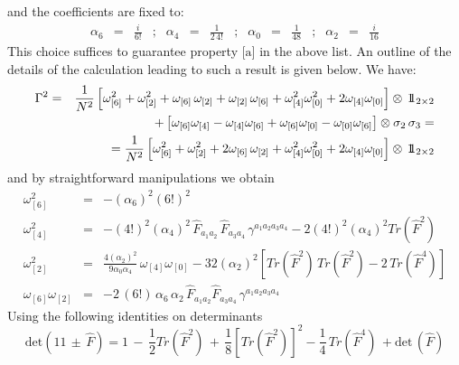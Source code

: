 \documentclass[a4paper,11pt]{article}
\begin{document}
and the coefficients are fixed to:
\begin{equation}
\begin{array}{rclcrclcrclcrcl}
\alpha_6 & = & \frac{i}{6!} &;&
\alpha_4 & = & \frac{1}{2 \, 4!} &;&
\alpha_0 & = & \frac{1}{48} &;&
\alpha_2 & = & \frac{i}{16}
\end{array}
\label{def alfa}
\end{equation}
This choice suffices to guarantee property $\mbox{[a]}$ in the above
list. An outline of the details of the calculation leading to such a result is given below. We have:
\begin{eqnarray}
\Gamma^{2} & = & \frac{1}{N^{2}} \left[\omega_{[6]}^{2} + \omega_{[2]}^{2} +
 \omega_{[6]} \, \omega_{[2]} + \omega_{[2]} \, \omega_{[6]} + \omega_{[4]}^{2} \omega_{[0]}^{2} +
2 \omega_{[4]} \omega_{[0]} \right] \otimes \, 1\!\!1_{2 \times 2} \nonumber \\
&& \hspace{0.3cm} + \left[\omega_{[6]}\omega_{[4]} - \omega_{[4]}\omega_{[6]} + \omega_{[6]} \omega_{[0]} - \omega_{[0]} \omega_{[6]} \right] \otimes \sigma_2 \, \sigma_3 = \nonumber \\
&& \hspace{-0.6cm} = \frac{1}{N^{2}} \left[\omega_{[6]}^{2} + \omega_{[2]}^{2} +
2 \omega_{[6]} \, \omega_{[2]} + \omega_{[4]}^{2} \omega_{[0]}^{2} +
2 \omega_{[4]} \omega_{[0]} \right] \otimes \, 1\!\!1_{2 \times 2}
\label{calc gamma}
\end{eqnarray}
and by straightforward manipulations we obtain
\begin{eqnarray}
\omega_{[6]}^{2} & = & - (\alpha_6)^{2}(6!)^{2} \nonumber \\
\omega_{[4]}^{2} & = & - (4!)^{2} (\alpha_{4})^{2} \,\hat{F}_{a_1 a_2} \,
\hat{F}_{a_3 a_4} \, \gamma^{a_1 a_2 a_3 a_4} - 2 (4!)^{2} (\alpha_{4})^{2} Tr(\hat{F}^{2}) \nonumber \\
\omega_{[2]}^{2} & = & \frac{4 (\alpha_2)^{2}}{9 \alpha_0 \alpha_4} \,
\omega_{[4]} \omega_{[0]} - 32 (\alpha_2)^{2} \left[Tr(\hat{F}^{2}) \, Tr(\hat{F}^{2}) -
2 \, Tr(\hat{F}^{4}) \right] \nonumber \\
\omega_{[6]} \omega_{[2]} & = & -2 \, (6!) \, \alpha_6 \, \alpha_2 \, \hat{F}_{a_1 a_2} \hat{F}_{a_3 a_4} \, \gamma^{a_1 a_2 a_3 a_4}
\end{eqnarray}
Using the following identities on determinants
\begin{equation}
\mbox{det} \left( 1 \!\! 1 \, \pm \, \hat{F} \right) = 1 \, - \, \frac{1}{2} Tr(\hat{F}^{2}) \,
+ \, \frac{1}{8} \left[Tr(\hat{F}^{2})\right]^{2} - \frac{1}{4} \, Tr(\hat{F}^{4}) \, + \mbox{det} \, (\hat{F})
\label{determinante eta}
\end{equation}
\end{document}
